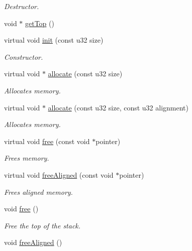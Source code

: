 \begin{DoxyCompactItemize}
\begin{DoxyCompactList}\small\item\em Destructor. \end{DoxyCompactList}\item 
void $\ast$ \hyperlink{classDE_1_1StackAllocator_a338da3513a5d49abb8ac7191b5201c37}{get\+Top} ()
\item 
virtual void \hyperlink{classDE_1_1StackAllocator_aa6f085873c6d8be29d1d24e205450b30}{init} (const u32 size)
\begin{DoxyCompactList}\small\item\em Constructor. \end{DoxyCompactList}\item 
virtual void $\ast$ \hyperlink{classDE_1_1StackAllocator_aec00ac9f2cc89aa7338bccb6cb030473}{allocate} (const u32 size)
\begin{DoxyCompactList}\small\item\em Allocates memory. \end{DoxyCompactList}\item 
virtual void $\ast$ \hyperlink{classDE_1_1StackAllocator_a405ba272b7615b56e5a4f93bd991bae6}{allocate} (const u32 size, const u32 alignment)
\begin{DoxyCompactList}\small\item\em Allocates memory. \end{DoxyCompactList}\item 
virtual void \hyperlink{classDE_1_1StackAllocator_ae1c77f32df6421293da96dc322f33c98}{free} (const void $\ast$pointer)
\begin{DoxyCompactList}\small\item\em Frees memory. \end{DoxyCompactList}\item 
virtual void \hyperlink{classDE_1_1StackAllocator_aac3d433b63805fbd046a3ce70d6d6305}{free\+Aligned} (const void $\ast$pointer)
\begin{DoxyCompactList}\small\item\em Frees aligned memory. \end{DoxyCompactList}\item 
void \hyperlink{classDE_1_1StackAllocator_a30cba40c244648427e741766d2f26ab7}{free} ()\hypertarget{classDE_1_1StackAllocator_a30cba40c244648427e741766d2f26ab7}{}\label{classDE_1_1StackAllocator_a30cba40c244648427e741766d2f26ab7}

\begin{DoxyCompactList}\small\item\em Free the top of the stack. \end{DoxyCompactList}\item 
void \hyperlink{classDE_1_1StackAllocator_ab85d29fe77b49d3b809ddb89ea2e0ed6}{free\+Aligned} ()\hypertarget{classDE_1_1StackAllocator_ab85d29fe77b49d3b809ddb89ea2e0ed6}{}\label{classDE_1_1StackAllocator_ab85d29fe77b49d3b809ddb89ea2e0ed6}


\end{DoxyCompactItemize}
